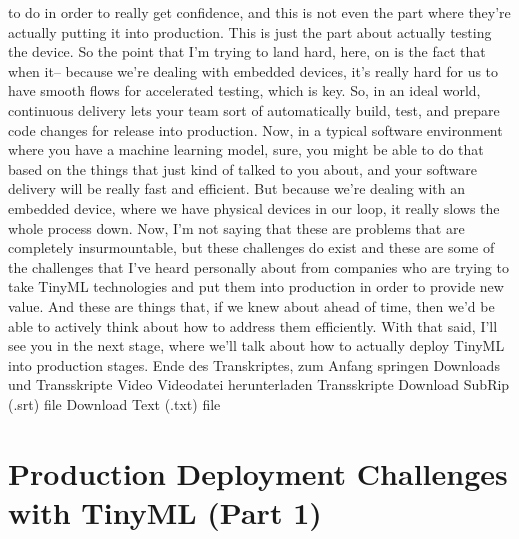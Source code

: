 {{{{    to do in order to really get confidence, and this is not even the part
    where they're actually putting it into production.
    This is just the part about actually testing the device.
    So the point that I'm trying to land hard, here, on
    is the fact that when it-- because we're dealing with embedded devices,
    it's really hard for us to have smooth flows for accelerated testing, which
    is key.
    So, in an ideal world, continuous delivery
    lets your team sort of automatically build, test, and prepare
    code changes for release into production.
    Now, in a typical software environment where
    you have a machine learning model, sure, you
    might be able to do that based on the things that just kind of talked
    to you about, and your software delivery will be really fast and efficient.
    But because we're dealing with an embedded device, where
    we have physical devices in our loop, it really slows the whole process down.
    Now, I'm not saying that these are problems
    that are completely insurmountable, but these challenges do exist
    and these are some of the challenges that I've
    heard personally about from companies who
    are trying to take TinyML technologies and put them into production in order
    to provide new value.
    And these are things that, if we knew about ahead of time, then
    we'd be able to actively think about how to address them efficiently.
    With that said, I'll see you in the next stage,
    where we'll talk about how to actually deploy TinyML into production stages.
    Ende des Transkriptes, zum Anfang springen
    Downloads und Transskripte
    Video
    Videodatei herunterladen
    Transskripte
    Download SubRip (.srt) file
    Download Text (.txt) file

\section{Production Deployment Challenges with TinyML (Part 1)}

}}}}
